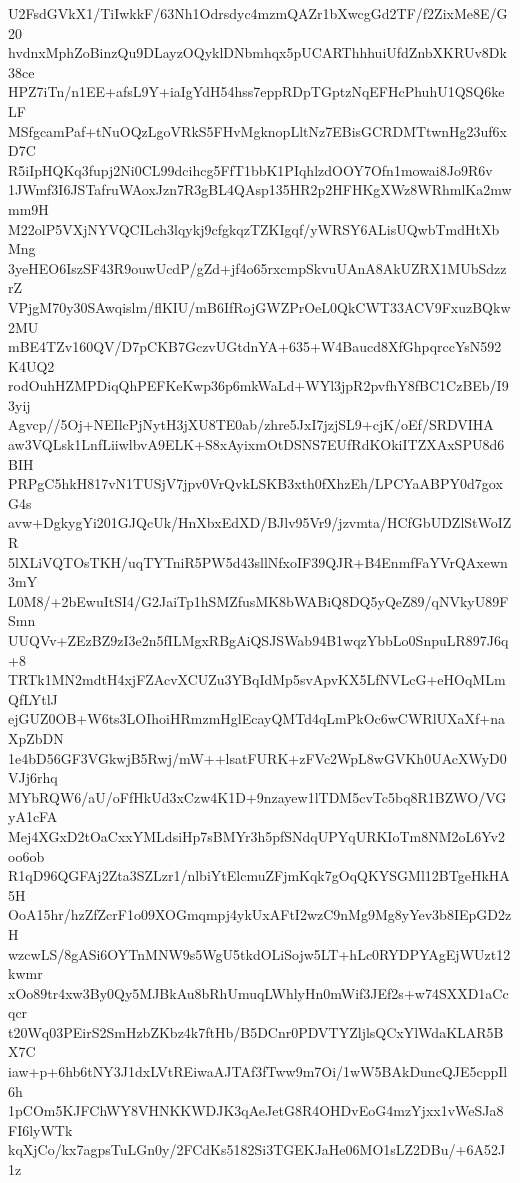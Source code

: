 U2FsdGVkX1/TiIwkkF/63Nh1Odrsdyc4mzmQAZr1bXwcgGd2TF/f2ZixMe8E/G20
hvdnxMphZoBinzQu9DLayzOQyklDNbmhqx5pUCARThhhuiUfdZnbXKRUv8Dk38ce
HPZ7iTn/n1EE+afsL9Y+iaIgYdH54hss7eppRDpTGptzNqEFHcPhuhU1QSQ6keLF
MSfgcamPaf+tNuOQzLgoVRkS5FHvMgknopLltNz7EBisGCRDMTtwnHg23uf6xD7C
R5iIpHQKq3fupj2Ni0CL99dcihcg5FfT1bbK1PIqhlzdOOY7Ofn1mowai8Jo9R6v
1JWmf3I6JSTafruWAoxJzn7R3gBL4QAsp135HR2p2HFHKgXWz8WRhmlKa2mwmm9H
M22olP5VXjNYVQCILch3lqykj9cfgkqzTZKIgqf/yWRSY6ALisUQwbTmdHtXbMng
3yeHEO6IszSF43R9ouwUcdP/gZd+jf4o65rxcmpSkvuUAnA8AkUZRX1MUbSdzzrZ
VPjgM70y30SAwqislm/flKIU/mB6IfRojGWZPrOeL0QkCWT33ACV9FxuzBQkw2MU
mBE4TZv160QV/D7pCKB7GczvUGtdnYA+635+W4Baucd8XfGhpqrccYsN592K4UQ2
rodOuhHZMPDiqQhPEFKeKwp36p6mkWaLd+WYl3jpR2pvfhY8fBC1CzBEb/I93yij
Agvcp//5Oj+NEIlcPjNytH3jXU8TE0ab/zhre5JxI7jzjSL9+cjK/oEf/SRDVIHA
aw3VQLsk1LnfLiiwlbvA9ELK+S8xAyixmOtDSNS7EUfRdKOkiITZXAxSPU8d6BIH
PRPgC5hkH817vN1TUSjV7jpv0VrQvkLSKB3xth0fXhzEh/LPCYaABPY0d7goxG4s
avw+DgkygYi201GJQcUk/HnXbxEdXD/BJlv95Vr9/jzvmta/HCfGbUDZlStWoIZR
5lXLiVQTOsTKH/uqTYTniR5PW5d43sllNfxoIF39QJR+B4EnmfFaYVrQAxewn3mY
L0M8/+2bEwuItSI4/G2JaiTp1hSMZfusMK8bWABiQ8DQ5yQeZ89/qNVkyU89FSmn
UUQVv+ZEzBZ9zI3e2n5fILMgxRBgAiQSJSWab94B1wqzYbbLo0SnpuLR897J6q+8
TRTk1MN2mdtH4xjFZAcvXCUZu3YBqIdMp5svApvKX5LfNVLcG+eHOqMLmQfLYtlJ
ejGUZ0OB+W6ts3LOIhoiHRmzmHglEcayQMTd4qLmPkOc6wCWRlUXaXf+naXpZbDN
1e4bD56GF3VGkwjB5Rwj/mW++lsatFURK+zFVc2WpL8wGVKh0UAcXWyD0VJj6rhq
MYbRQW6/aU/oFfHkUd3xCzw4K1D+9nzayew1lTDM5cvTc5bq8R1BZWO/VGyA1cFA
Mej4XGxD2tOaCxxYMLdsiHp7sBMYr3h5pfSNdqUPYqURKIoTm8NM2oL6Yv2oo6ob
R1qD96QGFAj2Zta3SZLzr1/nlbiYtElcmuZFjmKqk7gOqQKYSGMl12BTgeHkHA5H
OoA15hr/hzZfZcrF1o09XOGmqmpj4ykUxAFtI2wzC9nMg9Mg8yYev3b8IEpGD2zH
wzcwLS/8gASi6OYTnMNW9s5WgU5tkdOLiSojw5LT+hLc0RYDPYAgEjWUzt12kwmr
xOo89tr4xw3By0Qy5MJBkAu8bRhUmuqLWhlyHn0mWif3JEf2s+w74SXXD1aCcqcr
t20Wq03PEirS2SmHzbZKbz4k7ftHb/B5DCnr0PDVTYZljlsQCxYlWdaKLAR5BX7C
iaw+p+6hb6tNY3J1dxLVtREiwaAJTAf3fTww9m7Oi/1wW5BAkDuncQJE5cppIl6h
1pCOm5KJFChWY8VHNKKWDJK3qAeJetG8R4OHDvEoG4mzYjxx1vWeSJa8FI6lyWTk
kqXjCo/kx7agpsTuLGn0y/2FCdKs5182Si3TGEKJaHe06MO1sLZ2DBu/+6A52J1z
